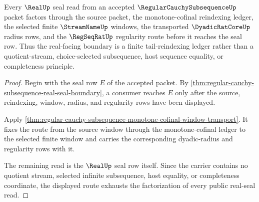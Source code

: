 \begin{theorem}
\label{thm:regular-cauchy-subsequence-real-seal-factorization}
Every $\RealUp$ seal read from an accepted $\RegularCauchySubsequenceUp$ packet factors through the source packet, the monotone-cofinal reindexing ledger, the selected finite $\StreamNameUp$ windows, the transported $\DyadicRatCoreUp$ radius rows, and the $\RegSeqRatUp$ regularity route before it reaches the seal row. Thus the real-facing boundary is a finite tail-reindexing ledger rather than a quotient-stream, choice-selected subsequence, host sequence equality, or completeness principle.
\end{theorem}
\begin{proof}
Begin with the seal row $E$ of the accepted packet. By \autoref{thm:regular-cauchy-subsequence-real-seal-boundary}, a consumer reaches $E$ only after the source, reindexing, window, radius, and regularity rows have been displayed.

Apply \autoref{thm:regular-cauchy-subsequence-monotone-cofinal-window-transport}. It fixes the route from the source window through the monotone-cofinal ledger to the selected finite window and carries the corresponding dyadic-radius and regularity rows with it.

The remaining read is the $\RealUp$ seal row itself. Since the carrier contains no quotient stream, selected infinite subsequence, host equality, or completeness coordinate, the displayed route exhausts the factorization of every public real-seal read.
\end{proof}

